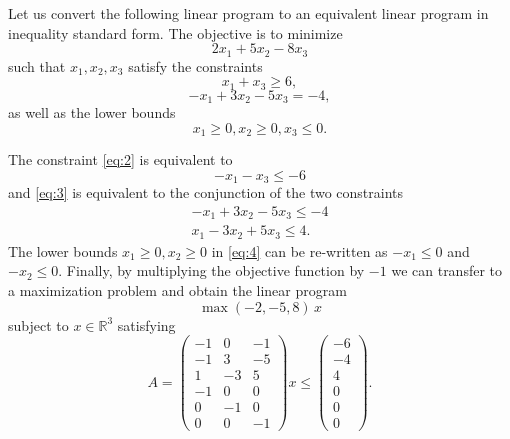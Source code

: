 \begin{example}
  \label{exe:1}
  Let us convert the following linear program to an equivalent linear program in inequality standard form. The objective is to minimize
\begin{displaymath}
  2 x_1 + 5 x_2 - 8 x_3 
\end{displaymath}
such that $x_1,x_2,x_3$ satisfy the constraints
\begin{equation}
  \label{eq:2}
  x_1+ x_3 ≥ 6, 
\end{equation}
\begin{equation}
  \label{eq:3}
  -x_1 + 3 x_2 - 5 x_3  = -4, 
\end{equation}
as well as the lower bounds
\begin{equation}
  \label{eq:4}
  x_1≥0, x_2 ≥ 0, x_3 ≤ 0.
\end{equation}

The constraint \eqref{eq:2} is equivalent to
\begin{displaymath}
   - x_1- x_3 ≤  -6 
 \end{displaymath}
 and \eqref{eq:3} is equivalent to the conjunction of the two constraints
 \begin{displaymath}
   \begin{array}{c}
     -x_1 + 3 x_2 - 5 x_3  ≤ -4 \\
      x_1 -3  x_2 + 5 x_3  ≤  4.  
   \end{array}
 \end{displaymath}
 The lower  bounds $ x_1≥0, x_2 ≥ 0$ in \eqref{eq:4} can be re-written as  $ - x_1≤0$ and $ -x_2 ≤ 0$. Finally, by multiplying the objective function by $-1$ we can transfer to a maximization problem and obtain the linear program
 \begin{displaymath}
     \max (-2, -5, 8)\,  x 
 \end{displaymath}
subject to $x ∈ ℝ^3$ satisfying 
 \begin{displaymath}
   A =
   \begin{pmatrix}
     - 1 & 0 & -1  \\
     -1 &  3 & - 5   \\
     1 &  -3 &  5   \\
     -1& 0 & 0 \\
     0 & -1 & 0\\
     0 & 0 & -1      
   \end{pmatrix} x ≤   
   \begin{pmatrix}
     -6\\ -4\\ 4\\ 0 \\ 0\\ 0
   \end{pmatrix}.
 \end{displaymath}
\end{example}


